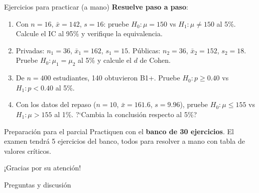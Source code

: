 \documentclass[aspectratio=169, 11pt]{beamer}
\begin{document}
\begin{frame}{Ejercicios para practicar (a mano)}
\textbf{Resuelve paso a paso}:
\begin{enumerate}
  \item Con $n = 16$, $\bar{x} = 142$, $s = 16$: pruebe $H_0: \mu = 150$ vs $H_1: \mu \neq 150$ al 5\%. Calcule el IC al 95\% y verifique la equivalencia.
  \item Privadas: $n_1 = 36$, $\bar{x}_1 = 162$, $s_1 = 15$. P\'ublicas: $n_2 = 36$, $\bar{x}_2 = 152$, $s_2 = 18$. Pruebe $H_0: \mu_1 = \mu_2$ al 5\% y calcule el $d$ de Cohen.
  \item De $n = 400$ estudiantes, 140 obtuvieron B1+. Pruebe $H_0: p \geq 0.40$ vs $H_1: p < 0.40$ al 5\%.
  \item Con los datos del repaso ($n = 10$, $\bar{x} = 161.6$, $s = 9.96$), pruebe $H_0: \mu \leq 155$ vs $H_1: \mu > 155$ al 1\%. ?`Cambia la conclusi\'on respecto al 5\%?
\end{enumerate}

\vspace{0.3cm}
\begin{alertblock}{Preparaci\'on para el parcial}
Practiquen con el \textbf{banco de 30 ejercicios}. El examen tendr\'a 5 ejercicios del banco, todos para resolver a mano con tabla de valores cr\'iticos.
\end{alertblock}
\end{frame}

\begin{frame}
\begin{center}
\Large
¡Gracias por su atención!

\vspace{1cm}
\normalsize
Preguntas y discusión
\end{center}
\end{frame}
\end{document}
